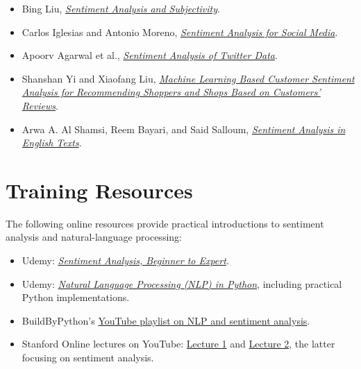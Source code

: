 \documentclass[12pt,openany]{book}
\theoremstyle{definition}
\theoremstyle{remark}
\begin{document}
\begin{itemize}
    \item Bing Liu,
    \href{https://www.cs.uic.edu/~liub/FBS/NLP-handbook-sentiment-analysis.pdf}
    {\emph{Sentiment Analysis and Subjectivity}}.

    \item Carlos Iglesias and Antonio Moreno,
    \href{https://www.researchgate.net/publication/337456453_Sentiment_Analysis_for_Social_Media}
    {\emph{Sentiment Analysis for Social Media}}.

    \item Apoorv Agarwal et al.,
    \href{http://www.cs.columbia.edu/~julia/papers/Agarwaletal11.pdf}
    {\emph{Sentiment Analysis of Twitter Data}}.

    \item Shanshan Yi and Xiaofang Liu,
    \href{https://link.springer.com/article/10.1007/s40747-020-00155-2}
    {\emph{Machine Learning Based Customer Sentiment Analysis for
    Recommending Shoppers and Shops Based on Customers' Reviews}}.

    \item Arwa A. Al Shamsi, Reem Bayari, and Said Salloum,
    \href{https://www.researchgate.net/publication/348153724_Sentiment_Analysis_in_English_Texts}
    {\emph{Sentiment Analysis in English Texts}}.
\end{itemize}

\section{Training Resources}

The following online resources provide practical introductions to sentiment
analysis and natural-language processing:

\begin{itemize}
    \item Udemy:
    \href{https://www.udemy.com/course/sentiment-analysis-beginner-to-expert/}
    {\emph{Sentiment Analysis, Beginner to Expert}}.

    \item Udemy:
    \href{https://www.udemy.com/course/data-science-natural-language-processing-in-python/}
    {\emph{Natural Language Processing (NLP) in Python}}, including practical
    Python implementations.

    \item BuildByPython's
    \href{https://www.youtube.com/playlist?list=PLhTjy8cBISEoOtB5_nwykvB9wfEDscuEo}
    {YouTube playlist on NLP and sentiment analysis}.

    \item Stanford Online lectures on YouTube:
    \href{https://www.youtube.com/watch?v=O1Xh3H1uEYY}{Lecture 1} and
    \href{https://www.youtube.com/watch?v=6-4pJt1M18s}{Lecture 2}, the latter
    focusing on sentiment analysis.
\end{itemize}
\end{document}
